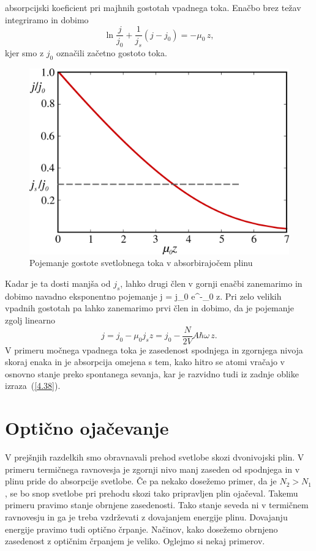absorpcijski koeficient pri majhnih gostotah vpadnega toka.
Enačbo brez težav integriramo in dobimo 
\begin{equation}
\ln\frac{j}{j_{0}}+\frac{1}{j_{s}}(j-j_{0})=-\mu_{0}\, z,\label{4.37}
\end{equation}
kjer smo z $j_{0}$ označili začetno gostoto toka. 
\begin{figure}[h]
\centering
\includegraphics[width=8truecm]{slike/05_jabs.png}
\caption{Pojemanje gostote svetlobnega toka v absorbirajočem plinu}
\label{fig:abs}
\end{figure}
Kadar je ta dosti
manjša od $j_{s}$, lahko drugi člen v gornji enačbi zanemarimo in dobimo 
navadno eksponentno pojemanje
\beq
j = j_0 e^{-\mu_0 z}.
\eeq
Pri zelo velikih vpadnih gostotah pa lahko zanemarimo prvi člen in dobimo, 
da je pojemanje zgolj linearno
\begin{equation}
j=j_{0}-\mu_{0}j_{s}z=j_{0}-\frac{N}{2V}A\hbar\omega\, z.
\label{4.38}
\end{equation}
V primeru močnega vpadnega toka je zasedenost spodnjega in zgornjega nivoja skoraj
enaka in je absorpcija omejena s tem, kako hitro se atomi vračajo
v osnovno stanje preko spontanega sevanja, kar je razvidno tudi iz
zadnje oblike izraza~(\ref{4.38}).

\section{Optično ojačevanje}
V prejšnjih razdelkih smo obravnavali prehod svetlobe skozi dvonivojski plin. V primeru
termičnega ravnovesja je zgornji nivo manj zaseden od spodnjega in v plinu pride
do absorpcije svetlobe. Če pa nekako dosežemo primer, da je $N_{2}>N_{1}$, 
se bo snop svetlobe pri prehodu skozi tako pripravljen plin ojačeval. 
Takemu primeru pravimo stanje obrnjene zasedenosti. 
Tako stanje seveda ni v termičnem ravnovesju in ga je treba vzdrževati z dovajanjem 
energije plinu. Dovajanju energije pravimo tudi optično črpanje. 
Načinov, kako dosežemo obrnjeno zasedenost z optičnim črpanjem je veliko. Oglejmo 
si nekaj primerov. \\

